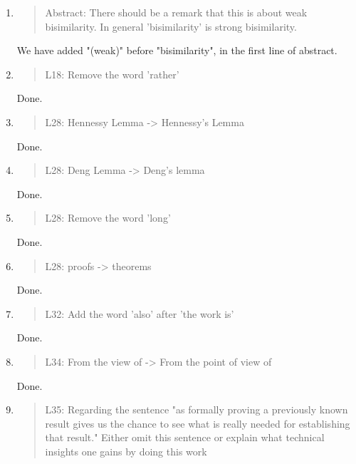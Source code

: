 \begin{enumerate}
\item \begin{quote}
    Abstract:
    There should be a remark that this is about weak bisimilarity. In
    general 'bisimilarity' is strong bisimilarity.
  \end{quote}
  We have added "(weak)" before "bisimilarity", in the first line of abstract.

\item \begin{quote}
    L18: Remove the word 'rather'
  \end{quote}
Done.
  
\item \begin{quote}
    L28: Hennessy Lemma -> Hennessy's Lemma
  \end{quote}
  Done.
  
\item \begin{quote}
    L28: Deng Lemma -> Deng's lemma
  \end{quote}
  Done.
  
\item \begin{quote}
    L28: Remove the word 'long'
  \end{quote}
  Done.
  
\item \begin{quote}
    L28: proofs -> theorems
  \end{quote}
  Done.
  
\item \begin{quote}
    L32: Add the word 'also' after 'the work is'
  \end{quote}
  Done.

\item \begin{quote}
    L34: From the view of -> From the point of view of
  \end{quote}
  Done.
  
\item \begin{quote}
    L35: Regarding the sentence "as formally proving a previously known result gives us the chance to see
    what is really needed for establishing that result."
    Either omit this sentence or explain what technical insights one
    gains by doing this work
  \end{quote}


\end{enumerate}
